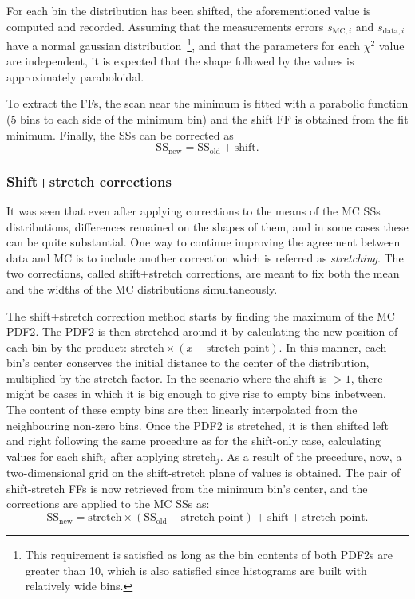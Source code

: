 For each bin the distribution has been shifted, the aforementioned \chisq value is computed and recorded. Assuming that the measurements errors \(s_{\text{MC},i}\) and \(s_{\text{data},i}\) have a normal gaussian distribution~\footnote{This requirement is satisfied as long as the bin contents of both \acp{PDF2} are greater than 10, which is also satisfied since histograms are built with relatively wide bins.}, and that the parameters for each \(\chi^2\) value are independent, it is expected that the shape followed by the \chisq values is approximately paraboloidal.

To extract the \acp{FF}, the \chisq scan near the minimum is fitted with a parabolic function (5 bins to each side of the minimum bin) and the shift \ac{FF} is obtained from the fit minimum. Finally, the \acp{SS} can be corrected as
\[
	\text{SS}_{\text{new}} = \text{SS}_{\text{old}} + \text{shift}.
\]


\subsubsection{Shift+stretch corrections}

It was seen that even after applying corrections to the means of the \ac{MC} \acp{SS} distributions, differences remained on the shapes of them, and in some cases these can be quite substantial. One way to continue improving the agreement between data and \ac{MC} is to include another correction which is referred as \textit{stretching}. The two corrections, called shift+stretch corrections, are meant to fix both the mean and the widths of the \ac{MC} distributions simultaneously.

The shift+stretch correction method starts by finding the maximum of the \ac{MC} \ac{PDF2}. The \ac{PDF2} is then stretched around it by calculating the new position of each bin by the product: \(\text{stretch}\times (x - \text{stretch point})\). In this manner, each bin's center conserves the initial distance to the center of the distribution, multiplied by the stretch factor. In the scenario where the shift is \(>1\), there might be cases in which it is big enough to give rise to empty bins inbetween. The content of these empty bins are then linearly interpolated from the neighbouring non-zero bins.
Once the \ac{PDF2} is stretched, it is then shifted left and right following the same procedure as for the shift-only case, calculating \chisq values for each \(\text{shift}_i\) after applying \(\text{stretch}_j\). As a result of the precedure, now, a two-dimensional grid on the shift-stretch plane of \chisq values is obtained. The pair of shift-stretch \acp{FF} is now retrieved from the minimum bin's center, and the corrections are applied to the \ac{MC} \acp{SS} as:
\begin{equation}
	\text{SS}_{\text{new}} = \text{stretch}\times(\text{SS}_{\text{old}} - \text{stretch point}) + \text{shift} + \text{stretch point}.
\end{equation}

